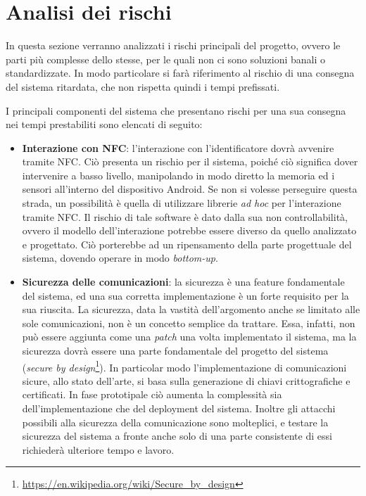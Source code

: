 \documentclass[a4paper,12pt]{report}
\begin{document}
\section{Analisi dei rischi}
In questa sezione verranno analizzati i rischi principali del progetto, ovvero le parti più complesse dello stesse, per le quali non ci sono soluzioni banali o standardizzate. In modo particolare si farà riferimento al rischio di una consegna del sistema ritardata, che non rispetta quindi i tempi prefissati. 

I principali componenti del sistema che presentano rischi per una sua consegna nei tempi prestabiliti sono elencati di seguito: 
\begin{itemize}
	\item \textbf{Interazione con NFC}: l'interazione con l'identificatore dovrà avvenire tramite NFC. Ciò presenta un rischio per il sistema, poiché ciò significa dover intervenire a basso livello, manipolando in modo diretto la memoria ed i sensori all'interno del dispositivo Android. Se non si volesse perseguire questa strada, un possibilità è quella di utilizzare librerie \emph{ad hoc} per l'interazione tramite NFC. Il rischio di tale software è dato dalla sua non controllabilità, ovvero il modello dell'interazione potrebbe essere diverso da quello analizzato e progettato. Ciò porterebbe ad un ripensamento della parte progettuale del sistema, dovendo operare in modo \emph{bottom-up}.
	\item \textbf{Sicurezza delle comunicazioni}: la sicurezza è una feature fondamentale del sistema, ed una sua corretta implementazione è un forte requisito per la sua riuscita. La sicurezza, data la vastità dell'argomento anche se limitato alle sole comunicazioni, non è un concetto semplice da trattare. Essa, infatti, non può essere aggiunta come una \emph{patch} una volta implementato il sistema, ma la sicurezza dovrà essere una parte fondamentale del progetto del sistema (\emph{secure by design}\footnote{\url{https://en.wikipedia.org/wiki/Secure_by_design}}). In particolar modo l'implementazione di comunicazioni sicure, allo stato dell'arte, si basa sulla generazione di chiavi crittografiche e certificati. In fase prototipale ciò aumenta la complessità sia dell'implementazione che del deployment del sistema. Inoltre gli attacchi possibili alla sicurezza della comunicazione sono molteplici, e testare la sicurezza del sistema a fronte anche solo di una parte consistente di essi richiederà ulteriore tempo e lavoro.

\end{itemize}
\end{document}
